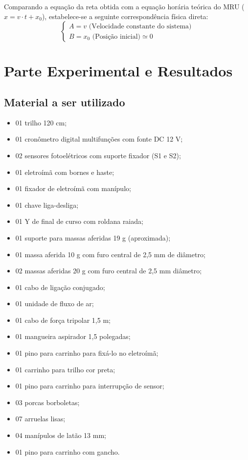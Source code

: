 \documentclass[12pt, a4paper]{article}
\begin{document}
Comparando a equação da reta obtida com a equação horária teórica do MRU ($x = v \cdot t + x_0$), estabelece-se a seguinte correspondência física direta:
\begin{equation}
    \begin{cases} 
      A = v \text{ (Velocidade constante do sistema)} \\
      B = x_0 \text{ (Posição inicial)} \simeq 0
   \end{cases}
\end{equation}

\section{Parte Experimental e Resultados}

\subsection{Material a ser utilizado}
\begin{itemize}
    \item 01 trilho 120 cm;
    \item 01 cronômetro digital multifunções com fonte DC 12 V;
    \item 02 sensores fotoelétricos com suporte fixador (S1 e S2);
    \item 01 eletroímã com bornes e haste;
    \item 01 fixador de eletroímã com manípulo;
    \item 01 chave liga-desliga;
    \item 01 Y de final de curso com roldana raiada;
    \item 01 suporte para massas aferidas 19 g (aproximada);
    \item 01 massa aferida 10 g com furo central de 2,5 mm de diâmetro;
    \item 02 massas aferidas 20 g com furo central de 2,5 mm diâmetro;
    \item 01 cabo de ligação conjugado;
    \item 01 unidade de fluxo de ar;
    \item 01 cabo de força tripolar 1,5 m;
    \item 01 mangueira aspirador 1,5 polegadas;
    \item 01 pino para carrinho para fixá-lo no eletroímã;
    \item 01 carrinho para trilho cor preta;
    \item 01 pino para carrinho para interrupção de sensor;
    \item 03 porcas borboletas;
    \item 07 arruelas lisas;
    \item 04 manípulos de latão 13 mm;
    \item 01 pino para carrinho com gancho.
\end{itemize}
\end{document}
